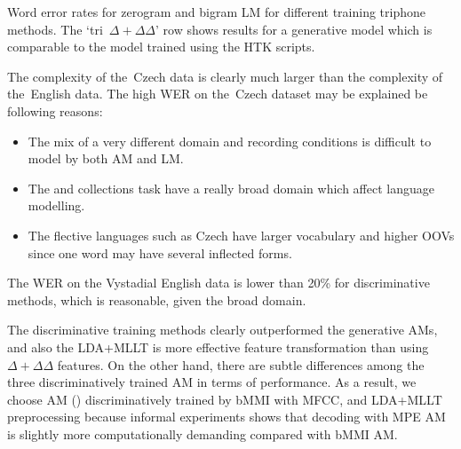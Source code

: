 \begin{table}[h]

\caption{Word error rates for zerogram and bigram LM for different training triphone methods.
    The `tri~$\Delta+\Delta\Delta$' row shows results for a generative model which is comparable to the model trained using the HTK scripts.
}
\label{tab:best}
\end{table}

The complexity of the~Czech data is clearly much larger than the complexity of the~English data.
The high \ac{WER} on the~Czech dataset may be explained be following reasons:
\begin{itemize}
    \item The mix of a very different domain and recording conditions is difficult to model by both \ac{AM} and \ac{LM}. 
    \item The  and  collections task have a really broad domain which affect language modelling.
    \item The flective languages such as Czech have larger vocabulary and higher \acp{OOV} since one word may have several inflected forms.
\end{itemize}

The \ac{WER} on the Vystadial English data is lower than 20\% for discriminative methods, which is reasonable, given the broad domain.

The discriminative training methods clearly outperformed the generative \acp{AM}, and also the \ac{LDA}+\ac{MLLT} is more effective feature transformation than using $\Delta+\Delta\Delta$ features.
On the other hand, there are subtle differences among the three discriminatively trained \ac{AM} in terms of performance.
As a result, we choose \ac{AM} () discriminatively trained by \ac{bMMI} with \ac{MFCC}, and \ac{LDA}+\ac{MLLT} preprocessing because informal experiments shows that decoding with \ac{MPE} \acl{AM} is slightly more computationally demanding compared with \ac{bMMI} \ac{AM}. 


